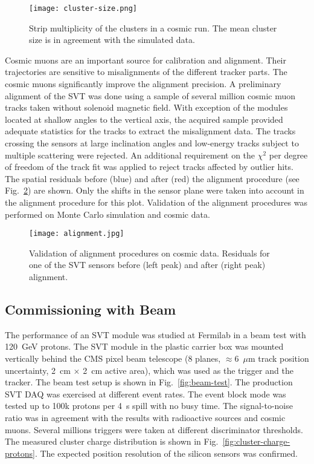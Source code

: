\begin{figure}[hbt] 
\centering 
\texttt{[image: cluster-size.png]}
\caption{Strip multiplicity of the clusters in a cosmic run. The mean cluster size is in agreement with the simulated
  data.}
\label{fig:cluster-size}
\end{figure}

Cosmic muons are an important source for calibration and alignment. Their trajectories are sensitive to
misalignments of the different tracker parts. The cosmic muons significantly improve the alignment precision. A
preliminary alignment of the SVT was done using a sample of several million cosmic muon tracks taken without
solenoid magnetic field. With exception of the modules located at shallow angles to the vertical axis, the acquired
sample provided adequate statistics for the tracks to extract the misalignment data. The tracks crossing the
sensors at large inclination angles and low-energy tracks subject to multiple scattering were rejected. An additional
requirement on the $\chi^2$ per degree of freedom of the track fit was applied to reject tracks affected by
outlier hits. The spatial residuals before (blue) and after (red) the alignment procedure (see
Fig.~\ref{fig:alignment}) are shown. Only the shifts in the sensor plane were taken into account in the alignment
procedure for this plot. Validation of the alignment procedures was performed on Monte Carlo simulation and cosmic
data.

\begin{figure}[hbt] 
\centering 
\texttt{[image: alignment.jpg]}
\caption{Validation of alignment procedures on cosmic data. Residuals for one of the SVT sensors before (left
  peak) and after (right peak) alignment.}
\label{fig:alignment}
\end{figure}

\subsection{Commissioning with Beam}

The performance of an SVT module was studied at Fermilab in a beam test with 120~GeV protons. The SVT module
in the plastic carrier box was mounted vertically behind the CMS pixel beam telescope (8 planes,
$\approx$6~$\mu$m track position uncertainty, 2~cm $\times$ 2~cm active area), which was used as the trigger
and the tracker. The beam test setup is shown in Fig.~\ref{fig:beam-test}. The production SVT DAQ was exercised
at different event rates. The event block mode was tested up to 100k protons per 4~s spill with no busy time. The
signal-to-noise ratio was in agreement with the results with radioactive sources and cosmic muons. Several millions
triggers were taken at different discriminator thresholds. The measured cluster charge distribution is shown in
Fig.~\ref{fig:cluster-charge-protons}.  The expected position resolution of the silicon sensors was confirmed. 

